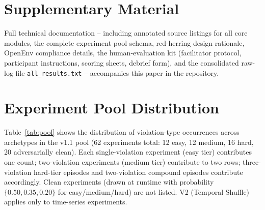\documentclass{article}
\begin{document}





\clearpage
\appendix
\section*{Supplementary Material}
Full technical documentation -- including annotated source listings for
all core modules, the complete experiment pool schema, red-herring
design rationale, OpenEnv compliance details, the human-evaluation kit
(facilitator protocol, participant instructions, scoring sheets,
debrief form), and the consolidated raw-log file
\texttt{all\_results.txt} -- accompanies this paper in the repository.

\section{Experiment Pool Distribution}
\label{app:pool}

Table~\ref{tab:pool} shows the distribution of violation-type occurrences
across archetypes in the v1.1 pool (62 experiments total: 12 easy,
12 medium, 16 hard, 20 adversarially clean).
Each single-violation experiment (easy tier) contributes one count;
two-violation experiments (medium tier) contribute to two rows;
three-violation hard-tier episodes and two-violation compound episodes
contribute accordingly.
Clean experiments (drawn at runtime with probability
$\{0.50, 0.35, 0.20\}$ for easy/medium/hard) are not listed.
V2 (Temporal Shuffle) applies only to time-series experiments.
\end{document}
